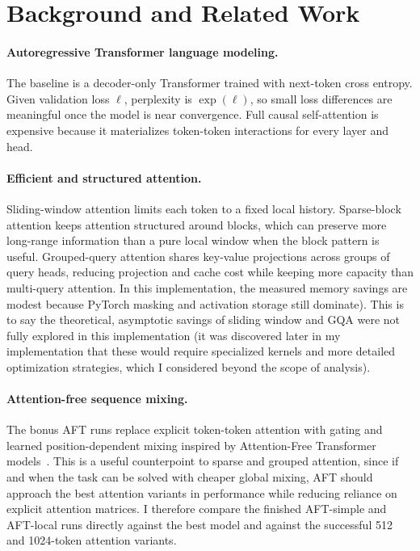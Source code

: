 \documentclass[11pt]{article}
\begin{document}
\section{Background and Related Work}
\paragraph{Autoregressive Transformer language modeling.}
The baseline is a decoder-only Transformer trained with next-token cross entropy. Given validation loss $\ell$, perplexity is $\exp(\ell)$, so small loss differences are meaningful once the model is near convergence. Full causal self-attention is expensive because it materializes token-token interactions for every layer and head.

\paragraph{Efficient and structured attention.}
Sliding-window attention limits each token to a fixed local history. Sparse-block attention keeps attention structured around blocks, which can preserve more long-range information than a pure local window when the block pattern is useful. Grouped-query attention shares key-value projections across groups of query heads, reducing projection and cache cost while keeping more capacity than multi-query attention. In this implementation, the measured memory savings are modest because PyTorch masking and activation storage still dominate). This is to say the theoretical, asymptotic savings of sliding window and GQA were not fully explored in this implementation (it was discovered later in my implementation that these would require specialized kernels and more detailed optimization strategies, which I considered beyond the scope of analysis).

\paragraph{Attention-free sequence mixing.}
The bonus AFT runs replace explicit token-token attention with gating and learned position-dependent mixing inspired by Attention-Free Transformer models~\cite{zhai2021}. This is a useful counterpoint to sparse and grouped attention, since if and when the task can be solved with cheaper global mixing, AFT should approach the best attention variants in performance while reducing reliance on explicit attention matrices. I therefore compare the finished AFT-simple and AFT-local runs directly against the best model and against the successful 512 and 1024-token attention variants.
\end{document}
